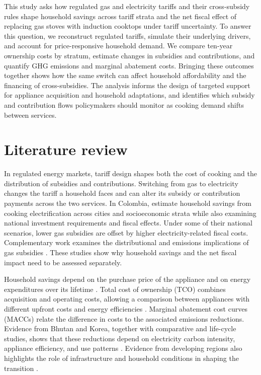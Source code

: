 \documentclass[authoryear,preprint,review,10pt]{elsarticle}
\begin{document}
This study asks how regulated gas and electricity tariffs and their cross-subsidy rules shape household savings across tariff strata and the net fiscal effect of replacing gas stoves with induction cooktops under tariff uncertainty. To answer this question, we reconstruct regulated tariffs, simulate their underlying drivers, and account for price-responsive household demand. We compare ten-year ownership costs by stratum, estimate changes in subsidies and contributions, and quantify GHG emissions and marginal abatement costs. Bringing these outcomes together shows how the same switch can affect household affordability and the financing of cross-subsidies. The analysis informs the design of targeted support for appliance acquisition and household adaptations, and identifies which subsidy and contribution flows policymakers should monitor as cooking demand shifts between services.

\section{Literature review}
\label{literature}

In regulated energy markets, tariff design shapes both the cost of cooking and the distribution of subsidies and contributions. Switching from gas to electricity changes the tariff a household faces and can alter its subsidy or contribution payments across the two services. In Colombia, \citet{cabrales2023costos} estimate household savings from cooking electrification across cities and socioeconomic strata while also examining national investment requirements and fiscal effects. Under some of their national scenarios, lower gas subsidies are offset by higher electricity-related fiscal costs. Complementary work examines the distributional and emissions implications of gas subsidies \citep{cabrales2025subsidios_gas}. These studies show why household savings and the net fiscal impact need to be assessed separately.

Household savings depend on the purchase price of the appliance and on energy expenditures over its lifetime \citep{dagnachew2020scenario}. Total cost of ownership (TCO) combines acquisition and operating costs, allowing a comparison between appliances with different upfront costs and energy efficiencies \citep{ellram1994taxonomy}. Marginal abatement cost curves (MACCs) relate the difference in costs to the associated emissions reductions. Evidence from Bhutan and Korea, together with comparative and life-cycle studies, shows that these reductions depend on electricity carbon intensity, appliance efficiency, and use patterns \citep{yangka2016,im2020,lee2021,bandekar2022,cimini2022}. Evidence from developing regions also highlights the role of infrastructure and household conditions in shaping the transition \citep{dagnachew2020scenario,floess2023,scott2024energy}.
\end{document}
